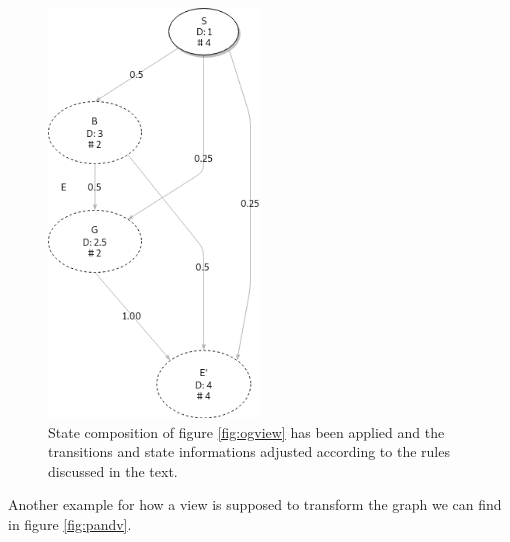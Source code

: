 \documentclass[12pt]{extarticle}
\begin{document}
\begin{figure}[hb]
    \centering
    \includegraphics[width=0.5\textwidth]{Diagrams/Statecharts/statemachine_view1.png}
    \caption{State composition of figure \ref{fig:ogview} has been applied and the transitions and state informations adjusted according to the rules discussed in the text.}
    \label{fig:view1}
\end{figure}

Another example for how a view is supposed to transform the graph we can find in figure \ref{fig:pandv}.
\end{document}
